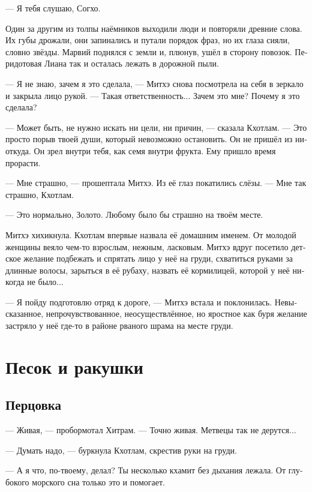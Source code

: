 \documentclass[a4paper,12pt,fleqn]{book}\usepackage{polyglossia}\setdefaultlanguage[babelshorthands=true]{russian}\setotherlanguage{english}\defaultfontfeatures{Ligatures=TeX,Mapping=tex-text}\usepackage{xcolor}\newcommand{\ml}[3]{#2}
\newcommand{\asterism}{\vspace{1em}{\centering\Large\bfseries$\ast~\ast~\ast$\par}\vspace{1em}}
\begin{document}
--- Я тебя слушаю, Согхо.

Один за другим из толпы наёмников выходили люди и повторяли древние слова.
Их губы дрожали, они запинались и путали порядок фраз, но их глаза сияли, словно звёзды.
Марвий поднялся с земли и, плюнув, ушёл в сторону повозок.
Перидотовая Лиана так и осталась лежать в дорожной пыли.

\asterism

--- Я не знаю, зачем я это сделала, --- Митхэ снова посмотрела на себя в зеркало и закрыла лицо рукой.
--- Такая ответственность...
Зачем это мне?
Почему я это сделала?

--- Может быть, не нужно искать ни цели, ни причин, --- сказала Кхотлам.
--- Это просто порыв твоей души, который невозможно остановить.
Он не пришёл из ниоткуда.
Он зрел внутри тебя, как семя внутри фрукта.
Ему пришло время прорасти.

--- Мне страшно, --- прошептала Митхэ.
Из её глаз покатились слёзы.
--- Мне так страшно, Кхотлам.

--- Это нормально, Золото.
Любому было бы страшно на твоём месте.

Митхэ хихикнула.
Кхотлам впервые назвала её домашним именем.
От молодой женщины веяло чем-то взрослым, нежным, ласковым.
Митхэ вдруг посетило детское желание подбежать и спрятать лицо у неё на груди, схватиться руками за длинные волосы, зарыться в её рубаху, назвать её кормилицей, которой у неё никогда не было...

--- Я пойду подготовлю отряд к дороге, --- Митхэ встала и поклонилась.
Невысказанное, непрочувствованное, неосуществлённое, но яростное как буря желание застряло у неё где-то в районе рваного шрама на месте груди.

\chapter{Песок и ракушки}

\section{Перцовка}

--- Живая, --- пробормотал Хитрам.
--- Точно живая.
Метвецы так не дерутся...

--- Думать надо, --- буркнула Кхотлам, скрестив руки на груди.

--- А я что, по-твоему, делал?
Ты несколько кхамит без дыхания лежала.
От глубокого морского сна только это и помогает.
\end{document}
